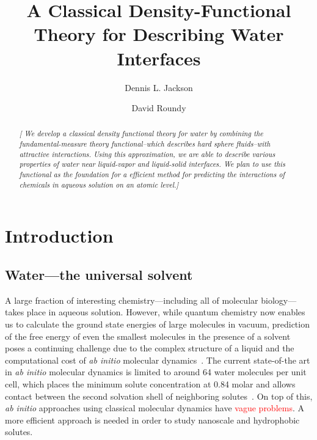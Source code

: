 \documentclass[letterpaper,twocolumn,amsmath,amssymb,prb]{revtex4-1}
\newcommand{\needsworklater}[1]{\emph{[#1]}}
\begin{document}
\title{A Classical Density-Functional Theory for Describing Water Interfaces}

\author{Dennis L. Jackson}

\author{David Roundy}

\begin{abstract}
\needsworklater{ We develop a classical density functional theory for
  water by combining the fundamental-measure theory functional--which
  describes hard sphere fluids--with attractive interactions.  Using
  this approximation, we are able to describe various properties of
  water near liquid-vapor and liquid-solid interfaces.  We plan to use
  this functional as the foundation for a efficient method for
  predicting the interactions of chemicals in aqueous solution on an
  atomic level.}
\end{abstract}

\maketitle

\section{Introduction}

\subsection{Water---the universal solvent}

A large fraction of interesting chemistry---including all of molecular
biology---takes place in aqueous solution.  However, while quantum
chemistry now enables us to calculate the ground state energies of
large molecules in vacuum, prediction of the free energy of even the
smallest molecules in the presence of a solvent poses a continuing
challenge due to the complex structure of a liquid and the
computational cost of \emph{ab initio} molecular
dynamics~\cite{car1985, grossman2004}.  The current state-of-the art
in \emph{ab initio} molecular dynamics is limited to around 64 water
molecules per unit cell, which places the minimum solute concentration
at 0.84 molar and allows contact between the second solvation shell of
neighboring solutes~\cite{izvekov2005, choe2007}.  On top of this,
\emph{ab initio} approaches using classical molecular dynamics have
\textcolor{red}{vague problems}\cite{weber2010ab-initio-water}.  A
more efficient approach is needed in order to study nanoscale and
hydrophobic solutes.
\end{document}
